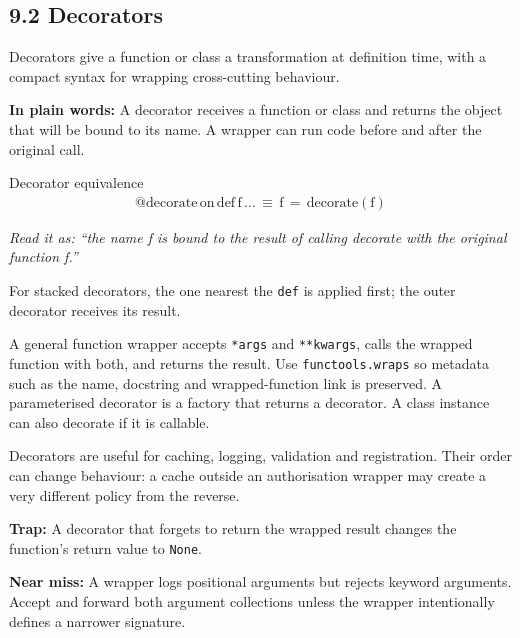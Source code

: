 \documentclass[11pt]{article}
\begin{document}
\begin{keepsection}
\section{9.2 Decorators}

Decorators give a function or class a transformation at definition time, with a compact syntax for wrapping cross-cutting behaviour.

\begin{plainbox}\textbf{In plain words:} A decorator receives a function or class and returns the object that will be bound to its name. A wrapper can run code before and after the original call.\end{plainbox}

\begin{equationcard}{Decorator equivalence}
\[ \begin{gathered} @\text{decorate}\, \text{on}\, \text{def}\, \mathrm{f}\, …\, ≡\, \mathrm{f}\, =\, \text{decorate}(\mathrm{f}) \end{gathered} \]
{\small \emph{Read it as: “the name f is bound to the result of calling decorate with the original function f.”}\par  For stacked decorators, the one nearest the \texttt{def} is applied first; the outer decorator receives its result.}
\end{equationcard}

A general function wrapper accepts \texttt{*args} and \texttt{**kwargs}, calls the wrapped function with both, and returns the result. Use \texttt{functools.wraps} so metadata such as the name, docstring and wrapped-function link is preserved. A parameterised decorator is a factory that returns a decorator. A class instance can also decorate if it is callable.

Decorators are useful for caching, logging, validation and registration. Their order can change behaviour: a cache outside an authorisation wrapper may create a very different policy from the reverse.

\begin{notebox}\textbf{Trap:} A decorator that forgets to return the wrapped result changes the function’s return value to \texttt{None}.\end{notebox}

\begin{notebox}\textbf{Near miss:} A wrapper logs positional arguments but rejects keyword arguments. Accept and forward both argument collections unless the wrapper intentionally defines a narrower signature.\end{notebox}


\end{keepsection}
\end{document}
